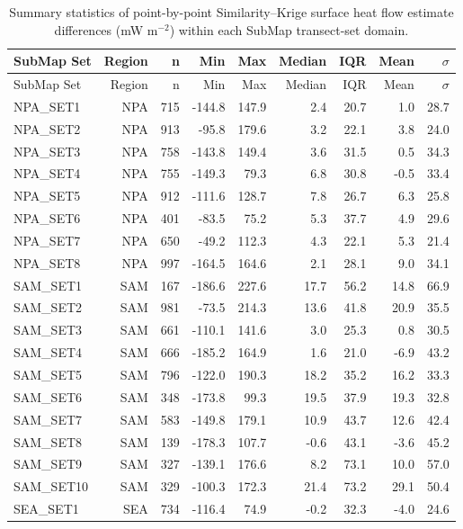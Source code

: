 \documentclass[final]{agujournal2019}
\begin{document}
\begin{longtable}[]{@{}lrrrrrrrr@{}}
\caption{Summary statistics of point-by-point Similarity--Krige surface
heat flow estimate differences (mW m\(^{-2}\)) within each SubMap
transect-set domain.}\label{tbl:est-diff-summary}\tabularnewline
\toprule\noalign{}
SubMap Set & Region & n & Min & Max & Median & IQR & Mean &
\(\sigma\) \\
\midrule\noalign{}
\endfirsthead
\toprule\noalign{}
SubMap Set & Region & n & Min & Max & Median & IQR & Mean &
\(\sigma\) \\
\midrule\noalign{}
\endhead
\bottomrule\noalign{}
\endlastfoot
NPA\_SET1 & NPA & 715 & -144.8 & 147.9 & 2.4 & 20.7 & 1.0 & 28.7 \\
NPA\_SET2 & NPA & 913 & -95.8 & 179.6 & 3.2 & 22.1 & 3.8 & 24.0 \\
NPA\_SET3 & NPA & 758 & -143.8 & 149.4 & 3.6 & 31.5 & 0.5 & 34.3 \\
NPA\_SET4 & NPA & 755 & -149.3 & 79.3 & 6.8 & 30.8 & -0.5 & 33.4 \\
NPA\_SET5 & NPA & 912 & -111.6 & 128.7 & 7.8 & 26.7 & 6.3 & 25.8 \\
NPA\_SET6 & NPA & 401 & -83.5 & 75.2 & 5.3 & 37.7 & 4.9 & 29.6 \\
NPA\_SET7 & NPA & 650 & -49.2 & 112.3 & 4.3 & 22.1 & 5.3 & 21.4 \\
NPA\_SET8 & NPA & 997 & -164.5 & 164.6 & 2.1 & 28.1 & 9.0 & 34.1 \\
SAM\_SET1 & SAM & 167 & -186.6 & 227.6 & 17.7 & 56.2 & 14.8 & 66.9 \\
SAM\_SET2 & SAM & 981 & -73.5 & 214.3 & 13.6 & 41.8 & 20.9 & 35.5 \\
SAM\_SET3 & SAM & 661 & -110.1 & 141.6 & 3.0 & 25.3 & 0.8 & 30.5 \\
SAM\_SET4 & SAM & 666 & -185.2 & 164.9 & 1.6 & 21.0 & -6.9 & 43.2 \\
SAM\_SET5 & SAM & 796 & -122.0 & 190.3 & 18.2 & 35.2 & 16.2 & 33.3 \\
SAM\_SET6 & SAM & 348 & -173.8 & 99.3 & 19.5 & 37.9 & 19.3 & 32.8 \\
SAM\_SET7 & SAM & 583 & -149.8 & 179.1 & 10.9 & 43.7 & 12.6 & 42.4 \\
SAM\_SET8 & SAM & 139 & -178.3 & 107.7 & -0.6 & 43.1 & -3.6 & 45.2 \\
SAM\_SET9 & SAM & 327 & -139.1 & 176.6 & 8.2 & 73.1 & 10.0 & 57.0 \\
SAM\_SET10 & SAM & 329 & -100.3 & 172.3 & 21.4 & 73.2 & 29.1 & 50.4 \\
SEA\_SET1 & SEA & 734 & -116.4 & 74.9 & -0.2 & 32.3 & -4.0 & 24.6 \\

\end{longtable}
\end{document}
